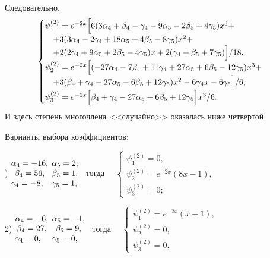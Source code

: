 \documentclass[11pt]{article}
\begin{document}
{Следовательно,
\begin{equation*}
\begin{cases}
\psi_1^{(2)} = e^{-2x} \Bigl[ 
6(3\alpha_4 + \beta_4 - \gamma_4 - 9 \alpha_5 - 2\beta_5 + 4\gamma_5) x^3 + \\
\quad + 3( 3\alpha_4 - 2\gamma_4 + 18 \alpha_5 + 4\beta_5 - 8\gamma_5) x^2 + \\
\quad + 2( 2\gamma_4 + 9\alpha_5 + 2\beta_5 - 4\gamma_5 ) x + 2(\gamma_4 + \beta_5 + 7\gamma_5) \Bigl]/18, \\
\psi_2^{(2)} = e^{-2x} \Bigl[ 
(-27\alpha_4 -7\beta_4 + 11\gamma_4 + 27\alpha_5 + 6\beta_5 - 12\gamma_5) x^3 + \\
\quad + 3( \beta_4 + \gamma_4 - 27\alpha_5 -6\beta_5 + 12\gamma_5 ) x^2 - 6\gamma_4 x - 6\gamma_5 \Bigl]/6, \\
\psi_3^{(2)} = e^{-2x} \Bigl[ 
\beta_4 + \gamma_4 - 27\alpha_5 - 6\beta_5 + 12\gamma_5 \Bigl] x^3 /6.
\end{cases}
\end{equation*}
И здесь степень многочлена <<случайно>> оказалась ниже четвертой.

Варианты выбора коэффициентов:

) $\begin{matrix} \alpha_4 = -16,\hfill\\ \beta_4 = 56,\\ \gamma_4 = -8,\hfill \end{matrix}$
$\begin{matrix} \alpha_5 = 2,\hfill\\ \beta_5 = 1,\\ \gamma_5 = 1,\hfill \end{matrix}$ \ 
тогда \ \ $\begin{cases} 
\psi_1^{(2)} = 0, \\
\psi_2^{(2)} = e^{-2x} (8x - 1), \\
\psi_3^{(2)} = 0;
\end{cases}$

\smallskip

2) $\begin{matrix} \alpha_4 = -6,\hfill\\ \beta_4 = 27,\\ \gamma_4 = 0,\hfill \end{matrix}$
$\begin{matrix} \alpha_5 = -1,\hfill\\ \beta_5 = 9,\\ \gamma_5 = 0,\hfill \end{matrix}$ \ 
тогда \ \ $\begin{cases} 
\psi_1^{(2)} = e^{-2x} (x+1), \\
\psi_2^{(2)} = 0, \\
\psi_3^{(2)} = 0.
\end{cases}$ 

}
\end{document}
